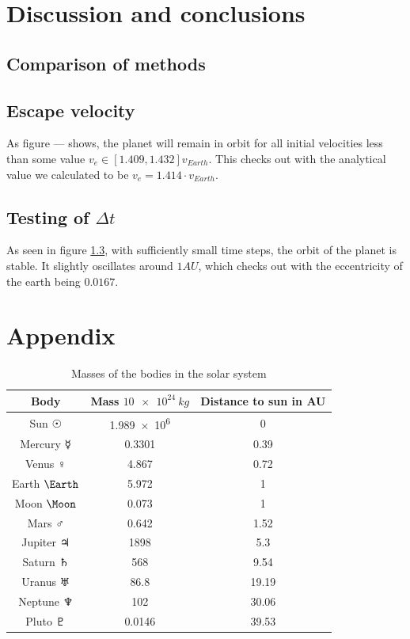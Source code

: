 \documentclass[10pt]{article}
\begin{document}
\begin{multicols}{2}
\section{Discussion and conclusions}



\subsection{Comparison of methods}

\subsection{Escape velocity}
As figure --- shows, the planet will remain in orbit for all initial velocities less than some value $v_e \in [1.409,1.432]v_{Earth}$. This checks out with the analytical value we calculated to be $v_e = 1.414\cdot v_{Earth}$.



\subsection{Testing of $\Delta t$}
As seen in figure \cref{}, with sufficiently small time steps, the orbit
of the planet is stable. It slightly oscillates around $1AU$, which checks
out with the eccentricity of the earth being $0.0167$.



\section*{Appendix}
\begin{table}[H]
    \caption{Masses of the bodies in the solar system}
    \centering
    \begin{tabular}{| c | c | c | }
        \hline
        Body & Mass $\SI{10e24}{kg}$ & Distance to sun in AU\\
        \hline
        Sun      $\Sun$   & \SI{1.989e6}{}&  0 \\
        Mercury  $\Mercury$ & 0.3301    &  0.39 \\
        Venus    $\Venus$   & 4.867     &  0.72 \\
        Earth    $\Earth$   & 5.972     &  1 \\
        Moon     $\Moon$    & 0.073     &  1 \\
        Mars     $\Mars$    & 0.642     &  1.52 \\
        Jupiter  $\Jupiter$ & 1898      &  5.3 \\
        Saturn   $\Saturn$  & 568       &  9.54 \\
        Uranus   $\Uranus$  & 86.8      & 19.19 \\
        Neptune  $\Neptune$ & 102       & 30.06 \\
        Pluto    $\Pluto$   & 0.0146    & 39.53 \\
        \hline
    \end{tabular}
    \label{tab:CelestialMasses}
\end{table}


{}


\end{multicols}
\end{document}
